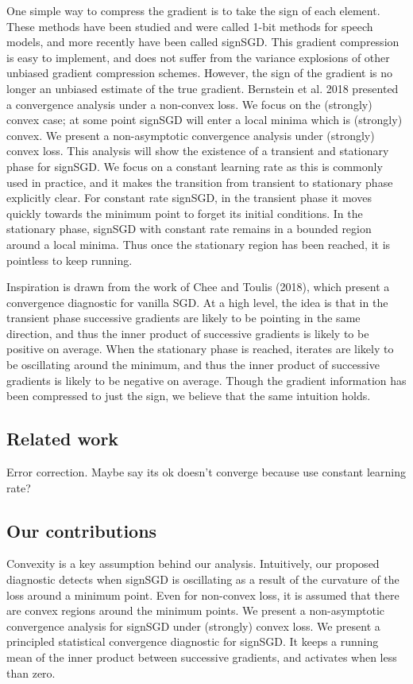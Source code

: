 \documentclass[12pt]{article}
\begin{document}
One simple way to compress the gradient is to take the sign of each element.
These methods have been studied and were called 1-bit methods for speech models, and more recently have been called signSGD.
This gradient compression is easy to implement, and does not suffer from the variance explosions of other unbiased gradient compression schemes.
However, the sign of the gradient is no longer an unbiased estimate of the true gradient.
Bernstein et al. 2018 presented a convergence analysis under a non-convex loss.
We focus on the (strongly) convex case; at some point signSGD will enter a local minima which is (strongly) convex. 
We present a non-asymptotic convergence analysis under (strongly) convex loss.
This analysis will show the existence of a transient and stationary phase for signSGD.
We focus on a constant learning rate as this is commonly used in practice, and it makes the transition from transient to stationary phase explicitly clear. 
For constant rate signSGD, in the transient phase it moves quickly towards the minimum point to forget its initial conditions.
In the stationary phase, signSGD with constant rate remains in a bounded region around a local minima. 
Thus once the stationary region has been reached, it is pointless to keep running.

Inspiration is drawn from the work of Chee and Toulis (2018), which present a convergence diagnostic for vanilla SGD.
At a high level, the idea is that in the transient phase successive gradients are likely to be pointing in the same direction, and thus the inner product of successive gradients is likely to be positive on average.
When the stationary phase is reached, iterates are likely to be oscillating around the minimum, and thus the inner product of successive gradients is likely to be negative on average.
Though the gradient information has been compressed to just the sign, we believe that the same intuition holds. 

\subsection{Related work}
Error correction. Maybe say its ok doesn't converge because use constant learning rate?

\subsection{Our contributions}
Convexity is a key assumption behind our analysis.
Intuitively, our proposed diagnostic detects when signSGD is oscillating as a result of the curvature of the loss around a minimum point.
Even for non-convex loss, it is assumed that there are convex regions around the minimum points.
We present a non-asymptotic convergence analysis for signSGD under (strongly) convex loss.
We present a principled statistical convergence diagnostic for signSGD. 
It keeps a running mean of the inner product between successive gradients, and activates when less than zero.
\end{document}
